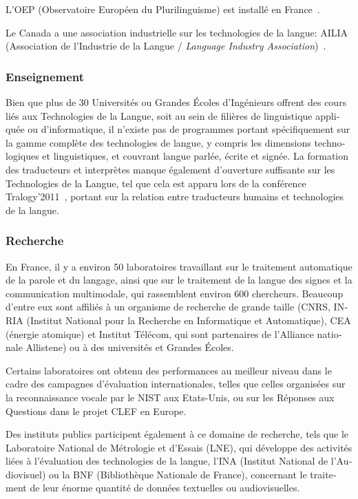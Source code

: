 \begin{french}
\begin{multicols}{2}
L'OEP (Observatoire Européen du Plurilinguisme) est installé en France~\cite{OEP}.

Le Canada a une association industrielle sur les technologies de la langue: AILIA
(Association de l'Industrie de la Langue / {\em Language Industry
Association})~\cite{ailia}.

\subsubsection{Enseignement}
Bien que plus de 30 Universités ou Grandes Écoles d'Ingénieurs
offrent des cours liés aux Technologies de la Langue, soit au sein de
filières de linguistique appliquée ou d'informatique, il
n'existe pas de programmes portant spécifiquement sur la gamme
complète des technologies de langue, y compris les dimensions
technologiques et linguistiques, et couvrant langue parlée, écrite et
signée. La formation des traducteurs et interprètes manque également
d'ouverture suffisante sur les Technologies de la Langue, tel que cela
est apparu lors de la conférence Tralogy'2011~\cite{tralogy},
portant sur la relation entre traducteurs humains et technologies de
la langue.

\subsubsection{Recherche}

En France, il y a environ 50 laboratoires travaillant sur le traitement
automatique de la parole et du langage, ainsi que sur le traitement de
la langue des signes et la communication multimodale, qui
rassemblent environ 600 chercheurs. Beaucoup d'entre eux sont affiliés
à un organisme de recherche de grande taille (CNRS, INRIA (Institut
National pour la Recherche en Informatique et Automatique), CEA
(énergie atomique) et Institut Télécom, qui sont partenaires de
l'Alliance nationale Allistene) ou à des universités et Grandes Écoles.

Certains laboratoires ont obtenu des performances au meilleur niveau
dans le cadre des campagnes d'évaluation internationales, telles que
celles organisées sur la reconnaissance vocale par le NIST aux
Etats-Unis, ou sur les Réponses aux Questions dans le projet CLEF en
Europe.

Des instituts publics participent également à ce domaine de
recherche, tels que le Laboratoire National de Métrologie et d'Essais
(LNE), qui développe des activités liées à l'évaluation des
technologies de la langue, l'INA (Institut National de l'Audiovisuel)
ou la BNF (Bibliothèque Nationale de France), concernant le traitement
de leur énorme quantité de données textuelles ou audiovisuelles.


\end{multicols}
\end{french}
